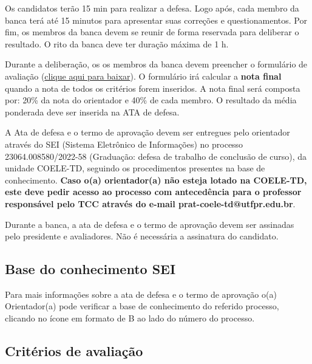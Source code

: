 \documentclass[a4paper, 12pt]{article}
\begin{document}
	Os candidatos terão 15 min para realizar a defesa. Logo após, cada membro da banca terá até 15 minutos para apresentar suas correções e questionamentos. Por fim, os membros da banca devem se reunir de forma reservada para deliberar o resultado. O rito da banca deve ter duração máxima de 1 h.
	
	Durante a deliberação, os os membros da banca devem preencher o formulário de avaliação (\href{https://nuvem.utfpr.edu.br/index.php/s/gK76empfxjAIMbl}{clique aqui para baixar}). O formulário irá calcular a \textbf{nota final} quando a nota de todos os critérios forem inseridos. A nota final será composta por: 20\% da nota do orientador e 40\% de cada membro. O resultado da média ponderada deve ser inserida na ATA de defesa. 
	
	
	
	A Ata de defesa e o termo de aprovação devem ser entregues pelo orientador através do SEI (Sistema Eletrônico de Informações) no processo 23064.008580/2022-58 (Graduação: defesa de trabalho de conclusão de curso), da unidade COELE-TD, seguindo os procedimentos presentes na base de conhecimento. \textbf{Caso o(a) orientador(a) não esteja lotado na COELE-TD, este deve pedir acesso ao processo com antecedência para o professor responsável pelo TCC através do e-mail prat-coele-td@utfpr.edu.br}.

	Durante a banca, a ata de defesa e o termo de aprovação devem ser assinadas pelo presidente e avaliadores. Não é necessária a assinatura do candidato. 
	
	\subsection{Base do conhecimento SEI}
	
	Para mais informações sobre a ata de defesa e o termo de aprovação o(a) Orientador(a) pode verificar a base de conhecimento do referido processo, clicando no ícone em formato de B ao lado do número do processo.
	
	\subsection{Critérios de avaliação}
	
\end{document}
